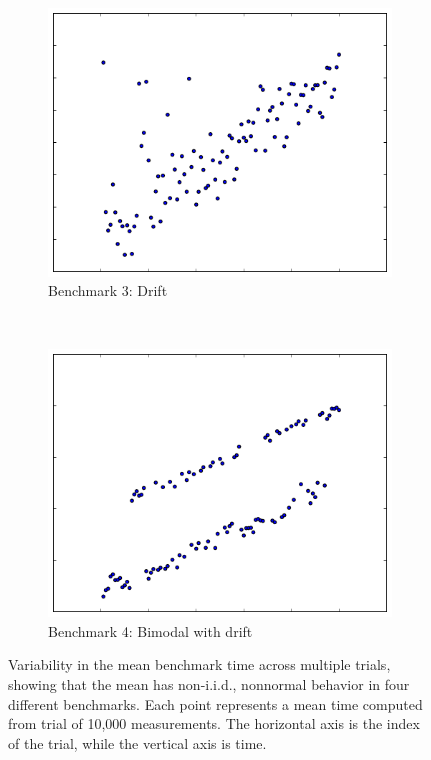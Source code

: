 \documentclass[conference]{IEEEtran}
\begin{document}
\begin{figure}
\begin{subfigure}{0.22\textwidth}
    \centering
    \includegraphics[width=\textwidth]{figures/fig1/drift_manyallocs_slow}
    \caption{Benchmark 3: Drift}
\end{subfigure}
~
\begin{subfigure}{0.22\textwidth}
    \centering
    \includegraphics[width=\textwidth]{figures/fig1/bimodal_drift_sumindex}
    \caption{Benchmark 4: Bimodal with drift}
\end{subfigure}
\caption{Variability in the mean benchmark time across multiple trials, showing
that the mean has non-i.i.d., nonnormal behavior in four different benchmarks.
Each point represents a mean time computed from trial of 10,000 measurements.
The horizontal axis is the index of the trial, while the vertical axis is time.}
\label{fig:meandistributions}
\vspace{-0.42cm} %
\end{figure}
\end{document}
